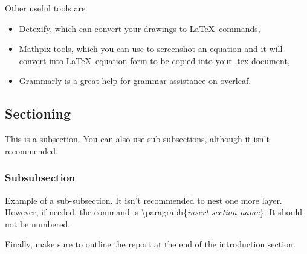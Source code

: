 Other useful tools are
\begin{itemize}
    \item Detexify, which can convert your drawings to \LaTeX\ commands, 
    \item Mathpix tools, which you can use to screenshot an equation and it will convert into \LaTeX\ equation form to be copied into your .tex document,
    \item Grammarly is a great help for grammar assistance on overleaf. 
\end{itemize}

\subsection{Sectioning}
This is a subsection. You can also use sub-subsections, although it isn't recommended.

\subsubsection{Subsubsection}
Example of a sub-subsection. It isn't recommended to nest one more layer. However, if needed, the command is \textbackslash paragraph\{\textit{insert section name}\}. It should not be numbered. 

\vspace{1em} 
Finally, make sure to outline the report at the end of the introduction section. 
